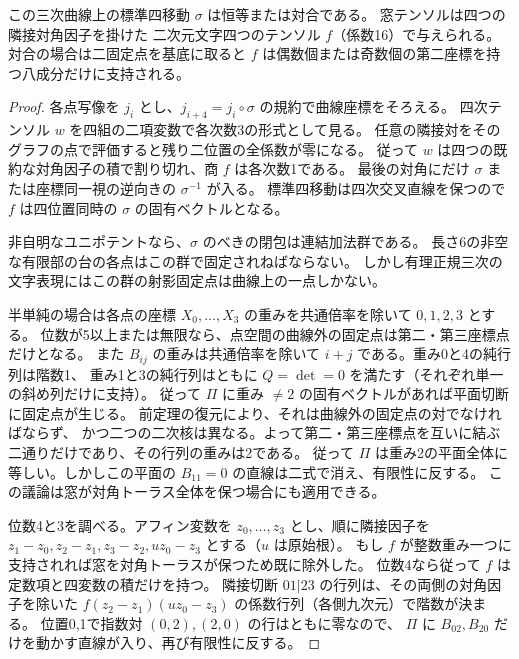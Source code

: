 \begin{theorem}\label{thm:twisted-cubic-monodromy}
この三次曲線上の標準四移動 $\sigma$ は恒等または対合である。
窓テンソルは四つの隣接対角因子を掛けた
二次元文字四つのテンソル $f$（係数16）で与えられる。
対合の場合は二固定点を基底に取ると $f$ は偶数個または奇数個の第二座標を持つ八成分だけに支持される。
\end{theorem}
\begin{proof}
各点写像を $j_i$ とし、$j_{i+4}=j_i\circ\sigma$ の規約で曲線座標をそろえる。
四次テンソル $w$ を四組の二項変数で各次数3の形式として見る。
任意の隣接対をそのグラフの点で評価すると残り二位置の全係数が零になる。
従って $w$ は四つの既約な対角因子の積で割り切れ、商 $f$ は各次数1である。
最後の対角にだけ $\sigma$ または座標同一視の逆向きの $\sigma^{-1}$ が入る。
標準四移動は四次交叉直線を保つので $f$ は四位置同時の $\sigma$ の固有ベクトルとなる。

非自明なユニポテントなら、$\sigma$ のべきの閉包は連結加法群である。
長さ6の非空な有限部の台の各点はこの群で固定されねばならない。
しかし有理正規三次の文字表現にはこの群の射影固定点は曲線上の一点しかない。

半単純の場合は各点の座標 $X_0,\ldots,X_3$ の重みを共通倍率を除いて $0,1,2,3$ とする。
位数が5以上または無限なら、点空間の曲線外の固定点は第二・第三座標点だけとなる。
また $B_{ij}$ の重みは共通倍率を除いて $i+j$ である。重み0と4の純行列は階数1、
重み1と3の純行列はともに $Q=\det=0$ を満たす（それぞれ単一の斜め列だけに支持）。
従って $\Pi$ に重み $\ne2$ の固有ベクトルがあれば平面切断に固定点が生じる。
前定理の復元により、それは曲線外の固定点の対でなければならず、
かつ二つの二次核は異なる。よって第二・第三座標点を互いに結ぶ二通りだけであり、その行列の重みは2である。
従って $\Pi$ は重み2の平面全体に等しい。しかしこの平面の $B_{11}=0$ の直線は二式で消え、有限性に反する。
この議論は窓が対角トーラス全体を保つ場合にも適用できる。

位数4と3を調べる。アフィン変数を $z_0,\ldots,z_3$ とし、順に隣接因子を
$z_1-z_0,z_2-z_1,z_3-z_2,u z_0-z_3$ とする（$u$ は原始根）。
もし $f$ が整数重み一つに支持されれば窓を対角トーラスが保つため既に除外した。
位数4なら従って $f$ は定数項と四変数の積だけを持つ。
隣接切断 $01|23$ の行列は、その両側の対角因子を除いた
$f(z_2-z_1)(u z_0-z_3)$ の係数行列（各側九次元）で階数が決まる。
位置0,1で指数対 $(0,2),(2,0)$ の行はともに零なので、
$\Pi$ に $B_{02},B_{20}$ だけを動かす直線が入り、再び有限性に反する。


\end{proof}
